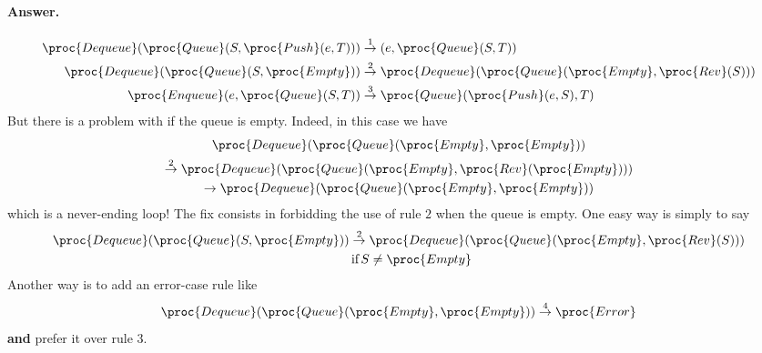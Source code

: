 \paragraph{Answer.}
\begin{align*}
\proc{Dequeue}(\proc{Queue}(S,\proc{Push}(e,T)))
&\stackrel{1}{\rightarrow} (e,\proc{Queue}(S,T))\\
\proc{Dequeue}(\proc{Queue}(S,\proc{Empty}))
&\stackrel{2}{\rightarrow}
\proc{Dequeue}(\proc{Queue}(\proc{Empty}, \proc{Rev}(S)))\\
\proc{Enqueue}(e,\proc{Queue}(S,T))
&\stackrel{3}{\rightarrow}
  \proc{Queue}(\proc{Push}(e,S),T)
\end{align*}
\noindent But there is a problem with  if the queue is
empty. Indeed, in this case we have
\begin{multline*}
\proc{Dequeue}(\proc{Queue}(\proc{Empty}, \proc{Empty}))\\
\stackrel{2}{\rightarrow} \proc{Dequeue}(\proc{Queue}(\proc{Empty},
\proc{Rev}(\proc{Empty})))\\
\rightarrow \proc{Dequeue}(\proc{Queue}(\proc{Empty}, \proc{Empty}))
\end{multline*}
\noindent which is a never-ending loop! The fix consists in forbidding
the use of rule \(2\) when the queue is empty. One easy way is simply
to say
\begin{gather*}
\proc{Dequeue}(\proc{Queue}(S,\proc{Empty})) \stackrel{2}{\rightarrow}
\proc{Dequeue}(\proc{Queue}(\proc{Empty}, \proc{Rev}(S)))\\
\qquad \text{if} \, S \neq \proc{Empty}
\end{gather*}
\noindent Another way is to add an error-case rule like
\[
\proc{Dequeue}(\proc{Queue}(\proc{Empty},\proc{Empty}))
\stackrel{4}{\rightarrow} \proc{Error}
\]
\noindent \textbf{and} prefer it over rule \(3\).
